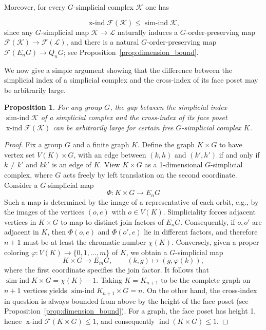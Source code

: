 \documentclass[preprint,12pt]{article}
\renewcommand{\le}{\leqslant}
\newtheorem{proposition}[theorem]{Proposition}
\theoremstyle{definition}
\theoremstyle{remark}
\numberwithin{equation}{section}
\DeclareMathOperator{\ind}{ind}
\DeclareMathOperator{\xind}{x-ind}
\DeclareMathOperator{\sind}{sim-ind}
\renewcommand{\phi}{\varphi}
\begin{document}
Moreover, for every $G$-simplicial complex $\mathcal{K}$ one has 

\begin{equation}\label{eq:index_inequality_4}
\xind \mathcal{F}(\mathcal{K}) \le \sind \mathcal{K}, 
\end{equation} 
since any $G$-simplicial map $\mathcal{K} \to \mathcal{L}$ naturally induces a $G$-order-preserving map $\mathcal{F}(\mathcal{K}) \to \mathcal{F}(\mathcal{L})$, and there is a natural $G$-order-preserving map $\mathcal{F}(E_n G) \to Q_n G$; see Proposition~\ref{prop:dimension_bound}. 

We now give a simple argument showing that the difference between the simplicial index of a simplicial complex and the cross-index of its face poset may be arbitrarily large.

\begin{proposition}
\label{proposition:chromatic}
For any group $G$, the gap between the simplicial index $\sind \mathcal{K}$ of a simplicial complex and the cross-index of its face poset $\xind \mathcal{F}(\mathcal{K})$ can be arbitrarily large for certain free $G$-simplicial complex $K$. 
\end{proposition}
\begin{proof}
Fix a group $G$ and a finite graph $K$. Define the graph $K \times G$ to have vertex set $V(K) \times G$, with an edge between $(k,h)$ and $(k',h')$ if and only if $k \ne k'$ and $kk'$ is an edge of $K$. View $K \times G$ as a 1-dimensional $G$-simplicial complex, where $G$ acts freely by left translation on the second coordinate. Consider a $G$-simplicial map 
$$\Phi \colon K \times G \longrightarrow E_n G$$ 
Such a map is determined by the image of a representative of each orbit, e.g., by the images of the vertices $(o,e)$ with $o \in V(K)$. Simpliciality forces adjacent vertices in $K \times G$ to map to distinct join factors of $E_n G$. Consequently, if $o,o'$ are adjacent in $K$, then $\Phi(o,e)$ and $\Phi(o',e)$ lie in different factors, and therefore $n+1$ must be at least the chromatic number $\chi(K)$. Conversely, given a proper coloring $\phi \colon V(K) \to \{0,1,\dots,m\}$ of $K$, we obtain a $G$-simplicial map 
$$K \times G \longrightarrow E_m G,\qquad (k,g) \longmapsto (g, \phi(k)),$$
where the first coordinate specifies the join factor. It follows that $\sind K \times G = \chi(K) - 1.$ Taking $K = K_{n+1}$ to be the complete graph on $n+1$ vertices yields $\sind K_{n+1} \times G = n$. On the other hand, the cross-index in question is always bounded from above by the height of the face poset (see Proposition~\ref{prop:dimension_bound}). For a graph, the face poset has height 1, hence $\xind \mathcal{F}(K \times G) \le 1$, and consequently $\ind (K \times G) \le 1$. 
\end{proof}
\end{document}
